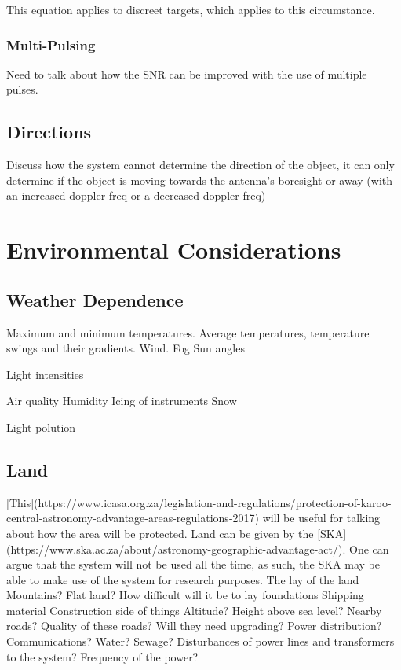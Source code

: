 \documentclass[11pt]{witseiepaper}
\begin{document}
This equation applies to discreet targets, which applies to this circumstance.

\subsubsection{Multi-Pulsing}

Need to talk about how the SNR can be improved with the use of multiple pulses.

\subsection{Directions}

Discuss how the system cannot determine the direction of the object, it can only determine if the object is moving towards the antenna's boresight or away (with an increased doppler freq or a decreased doppler freq)


\section{Environmental Considerations}

\subsection{Weather Dependence}

Maximum and minimum temperatures. Average temperatures, temperature swings and their gradients.
Wind.
Fog
Sun angles

Light intensities

Air quality
Humidity
Icing of instruments
Snow


Light polution



\subsection{Land}

[This](https://www.icasa.org.za/legislation-and-regulations/protection-of-karoo-central-astronomy-advantage-areas-regulations-2017) will be useful for talking about how the area will be protected.
Land can be given by the [SKA](https://www.ska.ac.za/about/astronomy-geographic-advantage-act/). One can argue that the system will not be used all the time, as such, the SKA may be able to make use of the system for research purposes.
The lay of the land
Mountains?
Flat land?
How difficult will it be to lay foundations
Shipping material
Construction side of things
Altitude? Height above sea level?
Nearby roads?
Quality of these roads? Will they need upgrading? 
Power distribution? 
Communications?
Water?
Sewage?
Disturbances of power lines and transformers to the system?
Frequency of the power?
\end{document}
